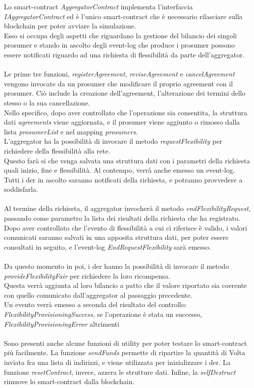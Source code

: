 Lo \gls{smart-contract} \textit{AggregatorContract} implementa l'interfaccia \textit{IAggregatorContract}
ed è l'unico \gls{smart-contract} che è necessario rilasciare sulla \gls{blockchain} per poter avviare la simulazione. \\
Esso si occupa degli aspetti che riguardano la gestione del bilancio dei singoli prosumer
e stando in ascolto degli \gls{event-log} che produce i \gls{prosumer} possono essere notificati riguardo ad una richiesta di flessibilità da parte dell'\gls{aggregator}. \\
\\
Le prime tre funzioni, \textit{registerAgreement}, \textit{reviseAgreement} e \textit{cancelAgreement} vengono invocate da un \gls{prosumer} che modificare il proprio \gls{agreement} con il \gls{prosumer}.
Ciò include la creazione dell'\gls{agreement}, l'alterazione dei termini dello stesso o la sua cancellazione. \\
Nello specifico, dopo aver controllato che l'operazione sia consentita, la struttura dati \textit{agreements} viene aggiornata,
e il prosumer viene aggiunto o rimosso dalla lista \textit{prosumerList} e nel mapping \textit{prosumers}.
\\
L'\gls{aggregator} ha la possibilità di invocare il metodo \textit{requestFlexibility} per richiedere della flessibilità alla rete. \\
Questo farà si che venga salvata una struttura dati con i parametri della richiesta quali inizio, fine e flessibilità.
Al contempo, verrà anche emesso un \gls{event-log}.
Tutti i \gls{der} in ascolto saranno notificati della richiesta, e potranno provvedere a soddisfarla. \\
\\
Al termine della richiesta, il \gls{aggregator} invocherà il metodo \textit{endFlexibilityRequest}, passando come parametro la lista dei risultati della richiesta che ha registrato.
Dopo aver controllato che l'evento di flessibilità a cui ci riferisce è valido, i valori comunicati saranno salvati in una apposita struttura dati, per poter essere consultati in seguito,
e l'\gls{event-log} \textit{EndRequestFlexibility} sarà emesso. \\
\\
Da questo momento in poi, i \gls{der} hanno la possibilità di invocare il metodo \textit{provideFlexibilityFair} per richiedere la loro ricompensa. \\
Questa verrà aggiunta al loro bilancio a patto che il valore riportato sia coerente con quello comunicato dall'\gls{aggregator} al passaggio precedente. \\
Un evento verrà emesso a seconda del risultato del controllo: \textit{FlexibilityProvisioningSuccess}, se l'operazione è stata un successo, \textit{FlexibilityProvisioningError} altrimenti \\
\\
Sono presenti anche alcune funzioni di utility per poter testare lo \gls{smart-contract} più facilmente.
La funzione \textit{sendFunds} permette di ripartire la quantità di Volta inviata fra una lista di indirizzi,
e viene utilizzata per inizializzare i \gls{der}.
La funzione \textit{resetContract}, invece, azzera le strutture dati.
Infine, la \textit{selfDestruct} rimuove lo \gls{smart-contract} dalla \gls{blockchain}.
